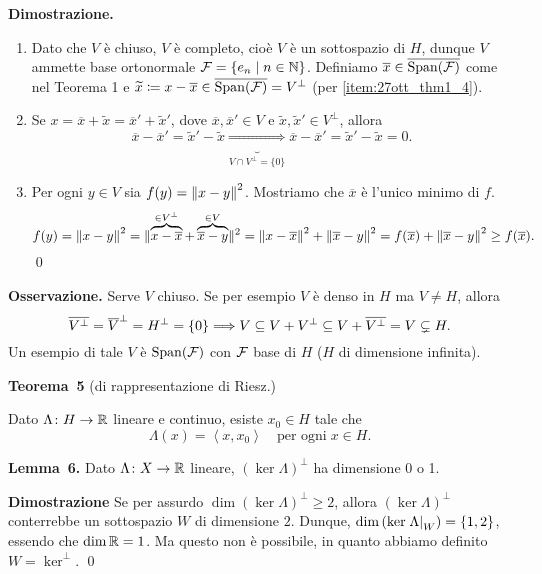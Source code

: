 \textbf{Dimostrazione.}
\begin{enumerate}
\item Dato che $V$ è chiuso, $V$ è completo, cioè $V$ è un sottospazio di $H$, dunque $V$ ammette base ortonormale $\mathcal{F} = \left\{ e_n \;\middle|\; n \in \mathbb N \right\}$.
Definiamo $\overline{x} \in \overline{\operatorname{Span}(\mathcal{F})}$ come nel Teorema 1 e $\widetilde{x} \coloneqq x - \overline{x} \in \overline{\operatorname{Span}(\mathcal{F})} = V^\perp$ (per \ref{item:27ott_thm1_4}).

\item Se $x = \overline{x} + \tilde{x} = \overline{x}' + \tilde{x}'$, dove $\overline{x}, \overline{x}' \in V$ e $\tilde{x}, \tilde{x}' \in V^\perp$, allora
%
$$
\overline{x} - \overline{x}' = \tilde{x}' - \tilde{x} \underbrace{\Longrightarrow}_{V \cap V^\perp = \{0 \} }
\overline{x} - \overline{x}' = \tilde{x}' - \tilde{x} = 0.
$$
%

\item Per ogni $y \in V$ sia $f(y) = \left\lVert x - y \right\rVert^2$. Mostriamo che $\overline{x}$ è l'unico minimo di $f$.
%
$$
f(y) = \left\lVert x - y \right\rVert^2 = \lVert{\overbrace{x - \overline{x}}^{\in V^\perp} + \overbrace{\overline{x} - y}^{\in V}}\rVert^2 = \left\lVert x - \overline{x} \right\rVert^2 + \left\lVert \overline{x} - y \right\rVert^2
= f(\overline{x}) + \left\lVert \overline{x} - y \right\rVert^2 \geq f(\overline{x}).
$$
%
\qed
\end{enumerate}

\vs

\textbf{Osservazione.}
Serve $V$ chiuso. Se per esempio $V$ è denso in $H$ ma $V \neq H$, allora
%
$$
\overline{V^\perp} = \overline{V}^\perp = H^\perp = \{0\} \Longrightarrow V \subseteq V + V^\perp \subseteq V + \overline{V^\perp} = V \subsetneq H.
$$
%
Un esempio di tale $V$ è $\operatorname{Span}(\mathcal{F})$ con $\mathcal{F}$ base di $H$ ($H$ di dimensione infinita).

\newpage

\hypertarget{thm:lez2728ott-teo3}{%
\textbf{Teorema~5} (di rappresentazione di Riesz.)} Dato $\Lambda \colon  H \to \mathbb R$ lineare e continuo, esiste $x_0 \in H$ tale che 
\begin{equation} \tag{$\ast$}
	\Lambda(x) = \left<x,x_0 \right> \quad \text{per ogni} \; x \in H.
\end{equation}

\textbf{Lemma~6.} Dato $\Lambda \colon X \to \mathbb R$ lineare, $\left( \ker \Lambda \right)^\perp$ ha dimensione 0 o 1.

\textbf{Dimostrazione} Se per assurdo $\dim (\ker \Lambda)^\perp \geq 2$, allora $(\ker \Lambda)^\perp$ conterrebbe un sottospazio $W$ di dimensione $2$.
Dunque, $\operatorname{dim} \left( \ker \left.\Lambda\right|_{W} \right) = \{1,2\}$, essendo che $\operatorname{dim} \mathbb R = 1$. Ma questo non è possibile, in quanto abbiamo definito $W = \ker^\perp$. 
\qed

